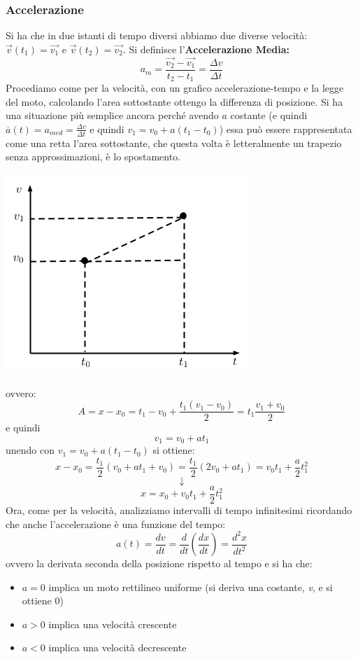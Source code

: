 \documentclass[a4paper,12pt, oneside]{book}
\begin{document}
\subsubsection{Accelerazione}
Si ha che in due istanti di tempo diversi abbiamo due diverse velocità: $\vec{v}(t_1)=\vec{v_1}$ e $\vec{v}(t_2)=\vec{v_2}$. Si definisce l'\textbf{Accelerazione Media:}
$$a_m=\frac{\vec{v_2}-\vec{v_1}}{t_2-t_1}=\frac{\Delta v}{\Delta t}$$
Procediamo come per la velocità, con un grafico accelerazione-tempo e la legge del moto, calcolando l'area sottostante ottengo la differenza di posizione. Si ha una situazione più semplice ancora perché avendo $a$ costante (e quindi $ \overline{a}(t)=a_{med}=\frac{\Delta v}{\Delta t}$ e quindi $v_1=v_0+a(t_1-t_0)$) essa può essere rappresentata come una retta l'area sottostante, che questa volta è letteralmente un trapezio senza approssimazioni, è lo spostamento.
\begin{center}
	\includegraphics[scale=0.5]{img/gra2.png}
\end{center}
ovvero:
$$A=x-x_0=t_1-v_0+\frac{t_1(v_1-v_0)}{2}=t_1\frac{v_1+v_0}{2}$$
e quindi
$$v_1=v_0+at_1$$
unendo con $v_1=v_0+a(t_1-t_0)$ si ottiene:
$$x-x_0=\frac{t_1}{2}(v_0+at_1+v_0)=\frac{t_1}{2}(2v_0+at_1)=v_0t_1+\frac{a}{2}t_1^2$$
$$\downarrow$$
$$x=x_0+v_0t_1+\frac{a}{2}t_1^2$$
Ora, come per la velocità, analizziamo intervalli di tempo infinitesimi ricordando che anche l'accelerazione è una funzione del tempo:
$$a(t)=\frac{dv}{dt}=\frac{d}{dt}\left(\frac{dx}{dt}\right)=\frac{d^2x}{dt^2}$$
ovvero la derivata seconda della posizione rispetto al tempo e si ha che:
\begin{itemize}
	\item $a=0$ implica un moto rettilineo uniforme (si deriva una costante, \textit{v}, e si ottiene 0)
	\item $a>0$ implica una velocità crescente
	\item $a<0$ implica una velocità decrescente
\end{itemize}
\end{document}
